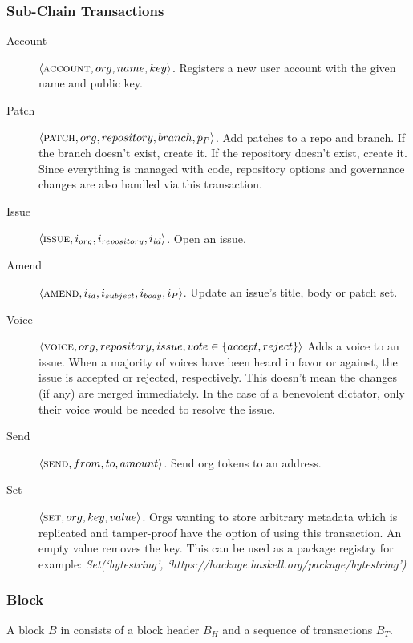\subsubsection{Sub-Chain Transactions} \label{source-chain-transactions}

\begin{description}
    \item[Account] $\langle \text{\normalfont\scshape account}, org, name, key \rangle$. Registers a new user account
        with the given name and public key.
    \item[Patch] $\langle \text{\normalfont\scshape patch}, org, repository, branch, p_P \rangle$.  Add patches to a
        repo and branch. If the branch doesn’t exist, create it. If the
        repository doesn’t exist, create it. Since everything is managed with
        code, repository options and governance changes are also handled via
        this transaction.
    \item[Issue] $\langle \text{\normalfont\scshape issue}, i_{org}, i_{repository}, i_{id} \rangle$. Open an issue.
    \item[Amend] $\langle \text{\normalfont\scshape amend}, i_{id}, i_{subject}, i_{body}, i_P \rangle$.
        Update an issue's title, body or patch set.
    \item[Voice] $\langle \text{\normalfont\scshape voice}, org, repository, issue, vote \in \{accept, reject\} \rangle$
        Adds a voice to an issue. When a majority of voices have been heard in
        favor or against, the issue is accepted or rejected, respectively. This
        doesn’t mean the changes (if any) are merged immediately. In the case
        of a benevolent dictator, only their voice would be needed to resolve
        the issue.
    \item[Send] $\langle \text{\normalfont\scshape send}, from, to, amount \rangle$. Send org tokens to an address.
    \item[Set] $\langle \text{\normalfont\scshape set}, org, key, value \rangle$. Orgs wanting to store
        arbitrary metadata which is replicated and tamper-proof have the option
        of using this transaction. An empty value removes the key. This can be
        used as a package registry for example: \emph{Set(`bytestring',
        `https://hackage.haskell.org/package/bytestring')}
\end{description}

\subsubsection{Block}

A block $B$ in \oscoin{} consists of a block header $B_H$ and a sequence of
transactions $B_T$.

